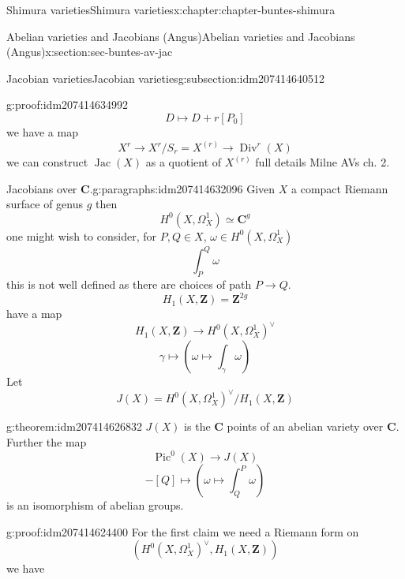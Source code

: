 \documentclass[oneside,10pt,]{book}
\numberwithin{equation}{section}
\newcommand{\ZZ}{\mathbf{Z}}
\newcommand{\CC}{\mathbf{C}}
\DeclareMathOperator{\divisors}{Div}
\DeclareMathOperator{\Pic}{Pic}
\DeclareMathOperator{\Jac}{Jac}
\begin{document}
\begin{chapterptx}{Shimura varieties}{}{Shimura varieties}{}{}{x:chapter:chapter-buntes-shimura}
\begin{sectionptx}{Abelian varieties and Jacobians (Angus)}{}{Abelian varieties and Jacobians (Angus)}{}{}{x:section:sec-buntes-av-jac}
\begin{subsectionptx}{Jacobian varieties}{}{Jacobian varieties}{}{}{g:subsection:idm207414640512}
\begin{proofptx}{}{g:proof:idm207414634992}
%
\begin{equation*}
D \mapsto D + r[P_0]
\end{equation*}
we have  a map%
\begin{equation*}
X^r \to X^r/ S_r = X^{(r)} \to \divisors^r(X)
\end{equation*}
we can construct \(\Jac(X)\) as a quotient of \(X^{(r)}\) full details Milne AVs ch. 2.%
\end{proofptx}
\begin{paragraphs}{Jacobians over \(\CC\).}{g:paragraphs:idm207414632096}%
Given \(X\) a compact Riemann surface of genus \(g\) then%
\begin{equation*}
H^0(X, \Omega_X^1) \simeq \CC^g
\end{equation*}
one might wish to consider, for \(P,Q \in X\), \(\omega\in H^0(X, \Omega_X^1)\)%
\begin{equation*}
\int_P^Q \omega
\end{equation*}
this is not well defined as there are choices of path \(P\to Q\).%
\begin{equation*}
H_1(X,\ZZ) = \ZZ^{2g}
\end{equation*}
have  a map%
\begin{equation*}
H_1(X,\ZZ) \to H^0(X, \Omega_X^1) ^\vee
\end{equation*}
%
\begin{equation*}
\gamma \mapsto (\omega \mapsto \int_\gamma \omega)
\end{equation*}
Let%
\begin{equation*}
J(X) = H^0(X, \Omega_X^1) ^\vee/H_1(X,\ZZ)
\end{equation*}
%
\begin{theorem}{}{}{g:theorem:idm207414626832}%
\(J(X) \) is the \(\CC\) points of an abelian variety over \(\CC\). Further the map%
\begin{equation*}
\Pic^0(X) \to J(X)
\end{equation*}
%
\begin{equation*}
[P] - [Q] \mapsto (\omega \mapsto \int^P_Q \omega)
\end{equation*}
is an isomorphism of abelian groups.%
\end{theorem}
\begin{proofptx}{}{g:proof:idm207414624400}
For the first claim we need a Riemann form on%
\begin{equation*}
(H^0(X, \Omega_X^1)^\vee , H_1(X,\ZZ))
\end{equation*}
we have%
\begin{equation*}

\end{equation*}
\end{proofptx}
\end{paragraphs}
\end{subsectionptx}
\end{sectionptx}
\end{chapterptx}
\end{document}
